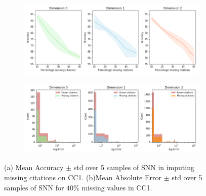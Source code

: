 \begin{figure}[tb]
\centering
 \begin{subfigure}[t]{-0.8\textwidth}
 \vspace{-4cm}
  \end{subfigure}
\begin{subfigure}[t]{0.8\textwidth}
\centering
   \includegraphics[scale=0.35]{./figures/accuracy_network1.png}
\end{subfigure}
 \begin{subfigure}[t]{0.8\textwidth}
  \end{subfigure}
\begin{subfigure}[t]{0.8\textwidth}
\centering
\vspace{-0.5cm}
   \includegraphics[scale=0.36]{./figures/Error_dist_start150250_seed6666_notsee40.png}
\end{subfigure}
\caption{(a) Mean Accuracy $\pm$ std over 5 samples of SNN in imputing missing citations on CC1. (b)Mean Absolute Error $\pm$ std over 5 samples of SNN for $40\%$ missing values in CC1. }
\label{fig:accuracy-error}
\end{figure}

